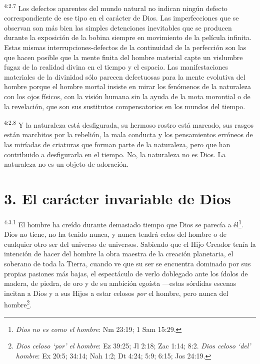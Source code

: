 \par
\textsuperscript{4:2.7} Los defectos aparentes del mundo natural no indican ningún defecto correspondiente de ese tipo en el carácter de Dios. Las imperfecciones que se observan son más bien las simples detenciones inevitables que se producen durante la exposición de la bobina siempre en movimiento de la película infinita. Estas mismas interrupciones-defectos de la continuidad de la perfección son las que hacen posible que la mente finita del hombre material capte un vislumbre fugaz de la realidad divina en el tiempo y el espacio. Las manifestaciones materiales de la divinidad sólo parecen defectuosas para la mente evolutiva del hombre porque el hombre mortal insiste en mirar los fenómenos de la naturaleza con los ojos físicos, con la visión humana sin la ayuda de la mota morontial o de la revelación, que son sus sustitutos compensatorios en los mundos del tiempo.

\par
\textsuperscript{4:2.8} Y la naturaleza está desfigurada, su hermoso rostro está marcado, sus rasgos están marchitos por la rebelión, la mala conducta y los pensamientos erróneos de las miríadas de criaturas que forman parte de la naturaleza, pero que han contribuido a desfigurarla en el tiempo. No, la naturaleza no es Dios. La naturaleza no es un objeto de adoración.

\section*{3. El carácter invariable de Dios}
\par
\textsuperscript{4:3.1} El hombre ha creído durante demasiado tiempo que Dios se parecía a él\footnote{\textit{Dios no es como el hombre}: Nm 23:19; 1 Sam 15:29.}. Dios no tiene, no ha tenido nunca, y nunca tendrá celos del hombre o de cualquier otro ser del universo de universos. Sabiendo que el Hijo Creador tenía la intención de hacer del hombre la obra maestra de la creación planetaria, el soberano de toda la Tierra, cuando ve que su ser se encuentra dominado por sus propias pasiones más bajas, el espectáculo de verlo doblegado ante los ídolos de madera, de piedra, de oro y de su ambición egoísta ---estas sórdidas escenas incitan a Dios y a sus Hijos a estar celosos \textit{por} el hombre, pero nunca del hombre\footnote{\textit{Dios celoso `por' el hombre}: Ez 39:25; Jl 2:18; Zac 1:14; 8:2. \textit{Dios celoso `del' hombre}: Ex 20:5; 34:14; Nah 1:2; Dt 4:24; 5:9; 6:15; Jos 24:19.}.

